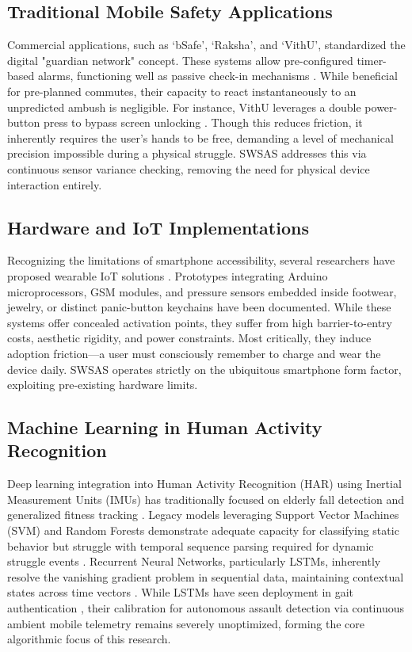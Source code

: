 \documentclass[10pt,journal,compsoc]{IEEEtran}
\begin{document}
\subsection{Traditional Mobile Safety Applications}
Commercial applications, such as `bSafe', `Raksha', and `VithU', standardized the digital "guardian network" concept. These systems allow pre-configured timer-based alarms, functioning well as passive check-in mechanisms \cite{phyo2018}. While beneficial for pre-planned commutes, their capacity to react instantaneously to an unpredicted ambush is negligible. For instance, VithU leverages a double power-button press to bypass screen unlocking \cite{bhattacharya2018}. Though this reduces friction, it inherently requires the user's hands to be free, demanding a level of mechanical precision impossible during a physical struggle. SWSAS addresses this via continuous sensor variance checking, removing the need for physical device interaction entirely.

\subsection{Hardware and IoT Implementations}
Recognizing the limitations of smartphone accessibility, several researchers have proposed wearable IoT solutions \cite{kumar2019}. Prototypes integrating Arduino microprocessors, GSM modules, and pressure sensors embedded inside footwear, jewelry, or distinct panic-button keychains have been documented. While these systems offer concealed activation points, they suffer from high barrier-to-entry costs, aesthetic rigidity, and power constraints. Most critically, they induce adoption friction—a user must consciously remember to charge and wear the device daily. SWSAS operates strictly on the ubiquitous smartphone form factor, exploiting pre-existing hardware limits.

\subsection{Machine Learning in Human Activity Recognition}
Deep learning integration into Human Activity Recognition (HAR) using Inertial Measurement Units (IMUs) has traditionally focused on elderly fall detection and generalized fitness tracking \cite{lara2013}. Legacy models leveraging Support Vector Machines (SVM) and Random Forests demonstrate adequate capacity for classifying static behavior but struggle with temporal sequence parsing required for dynamic struggle events \cite{wu2018}. Recurrent Neural Networks, particularly LSTMs, inherently resolve the vanishing gradient problem in sequential data, maintaining contextual states across time vectors \cite{hochreiter1997}. While LSTMs have seen deployment in gait authentication \cite{ordonez2016}, their calibration for autonomous assault detection via continuous ambient mobile telemetry remains severely unoptimized, forming the core algorithmic focus of this research.
\end{document}
